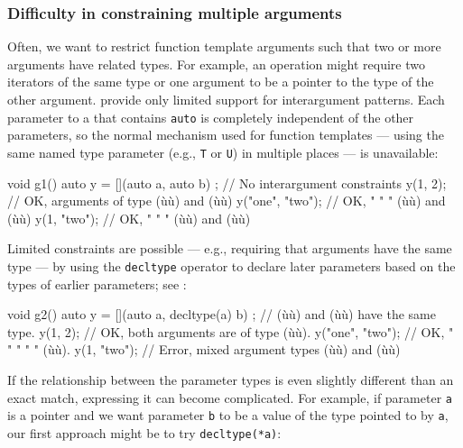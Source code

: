 {\subsubsection[Difficulty in constraining multiple arguments]{Difficulty in constraining multiple arguments}\label{difficulty-in-constraining-multiple-arguments}

Often, we want to restrict function template arguments such that two or
more arguments have related types. For example, an operation might
require two iterators of the same type or one argument to be a pointer
to the type of the other argument.  provide only
limited support for interargument patterns. Each parameter to a
 that contains \lstinline!auto! is completely
independent of the other parameters, so the normal mechanism used for
function templates --- using the same named type parameter (e.g.,
\lstinline!T! or \lstinline!U!) in multiple places --- is unavailable:

\begin{emcppslisting}
void g1()
{
    auto y = [](auto a, auto b) { };  // No interargument constraints
    y(1, 2);          // OK, arguments of type (ù{}ù) and (ù{}ù)
    y("one", "two");  // OK,     "      "   "  (ù{}ù) and (ù{}ù)
    y(1, "two");      // OK,     "      "   "  (ù{}ù) and (ù{}ù)
}
\end{emcppslisting}
    

\noindent Limited constraints are possible --- e.g., requiring that arguments have
the same type --- by using the \lstinline!decltype! operator to declare
later parameters based on the types of earlier parameters; see
:

\begin{emcppslisting}
void g2()
{
    auto y = [](auto a, decltype(a) b) { };  // (ù{}ù) and (ù{}ù) have the same type.
    y(1, 2);          // OK, both arguments are of type (ù{}ù).
    y("one", "two");  // OK,   "      "      "   "   "  (ù{}ù).
    y(1, "two");      // Error, mixed argument types (ù{}ù) and (ù{}ù)
}
\end{emcppslisting}
    

\noindent If the relationship between the parameter types is even slightly
different than an exact match, expressing it can become complicated. For
example, if parameter \lstinline!a! is a pointer and we want parameter
\lstinline!b! to be a value of the type pointed to by \lstinline!a!, our first
approach might be to try \lstinline!decltype(*a)!:

}
